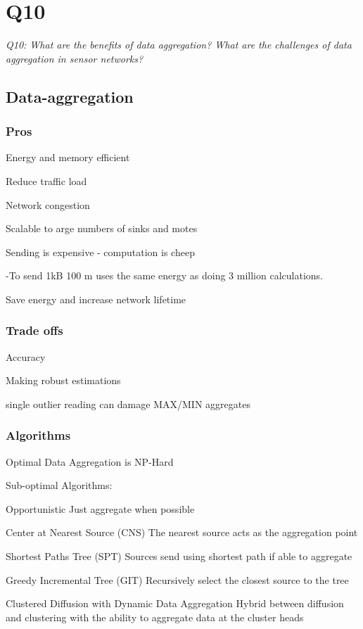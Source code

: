 \chapter{Q10}
\emph{Q10: What are the benefits of data aggregation? What are the challenges
of data aggregation in sensor networks?}

\section{Data-aggregation}

\subsection{Pros}

Energy and memory efficient

Reduce traffic load

Network congestion

Scalable to arge numbers of sinks and motes

Sending is expensive - computation is cheep

-To send 1kB 100 m uses the same energy as doing 3 million calculations.

Save energy and increase network lifetime

\subsection{Trade offs}

Accuracy 

Making robust estimations

single outlier reading can damage MAX/MIN aggregates

\subsection{Algorithms}
Optimal Data Aggregation is NP-Hard

Sub-optimal Algorithms:
\begin{description}
	\item{Opportunistic} Just aggregate when possible
	\item{Center at Nearest Source (CNS)} The nearest source acts as the
		aggregation point
	\item{Shortest Paths Tree (SPT)} Sources send using shortest path if able
		to aggregate
	\item{Greedy Incremental Tree (GIT)} Recursively select the closest source
		to the tree
	\item{Clustered Diffusion with Dynamic Data Aggregation} Hybrid between
		diffusion and clustering with the ability to aggregate data at the
		cluster heads
\end{description}

